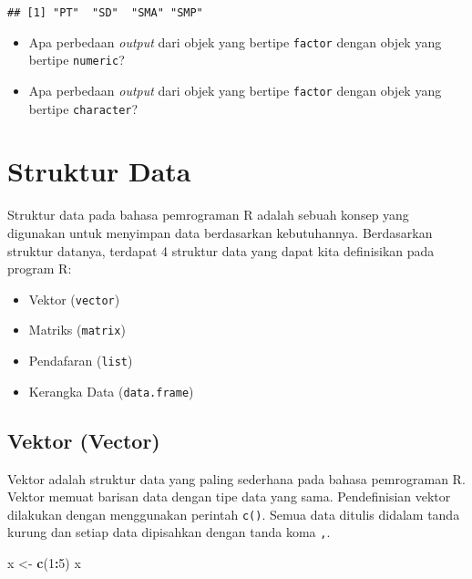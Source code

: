 \documentclass[
]{book}
\newenvironment{Shaded}{\begin{snugshade}}{\end{snugshade}}
\newcommand{\DecValTok}[1]{\textcolor[rgb]{0.00,0.00,0.81}{#1}}
\newcommand{\KeywordTok}[1]{\textcolor[rgb]{0.13,0.29,0.53}{\textbf{#1}}}
\newcommand{\NormalTok}[1]{#1}
\newcommand{\OperatorTok}[1]{\textcolor[rgb]{0.81,0.36,0.00}{\textbf{#1}}}
\newcommand{\StringTok}[1]{\textcolor[rgb]{0.31,0.60,0.02}{#1}}
\providecommand{\tightlist}{%
  \setlength{\itemsep}{0pt}\setlength{\parskip}{0pt}}
\begin{document}
\begin{verbatim}
## [1] "PT"  "SD"  "SMA" "SMP"
\end{verbatim}

\begin{itemize}
\tightlist
\item
  Apa perbedaan \emph{output} dari objek yang bertipe \texttt{factor} dengan objek yang bertipe \texttt{numeric}?
\item
  Apa perbedaan \emph{output} dari objek yang bertipe \texttt{factor} dengan objek yang bertipe \texttt{character}?
\end{itemize}

\hypertarget{struktur-data}{%
\chapter{Struktur Data}\label{struktur-data}}

Struktur data pada bahasa pemrograman R adalah sebuah konsep yang digunakan untuk menyimpan data berdasarkan kebutuhannya. Berdasarkan struktur datanya, terdapat 4 struktur data yang dapat kita definisikan pada program R:

\begin{itemize}
\tightlist
\item
  Vektor (\texttt{vector})
\item
  Matriks (\texttt{matrix})
\item
  Pendafaran (\texttt{list})
\item
  Kerangka Data (\texttt{data.frame})
\end{itemize}

\hypertarget{vector}{%
\section{Vektor (Vector)}\label{vector}}

Vektor adalah struktur data yang paling sederhana pada bahasa pemrograman R. Vektor memuat barisan data dengan tipe data yang sama. Pendefinisian vektor dilakukan dengan menggunakan perintah \texttt{c()}. Semua data ditulis didalam tanda kurung dan setiap data dipisahkan dengan tanda koma \texttt{,}.

\begin{Shaded}
\begin{Highlighting}[]
\NormalTok{x <-}\StringTok{ }\KeywordTok{c}\NormalTok{(}\DecValTok{1}\OperatorTok{:}\DecValTok{5}\NormalTok{)}
\NormalTok{x}
\end{Highlighting}
\end{Shaded}
\end{document}
